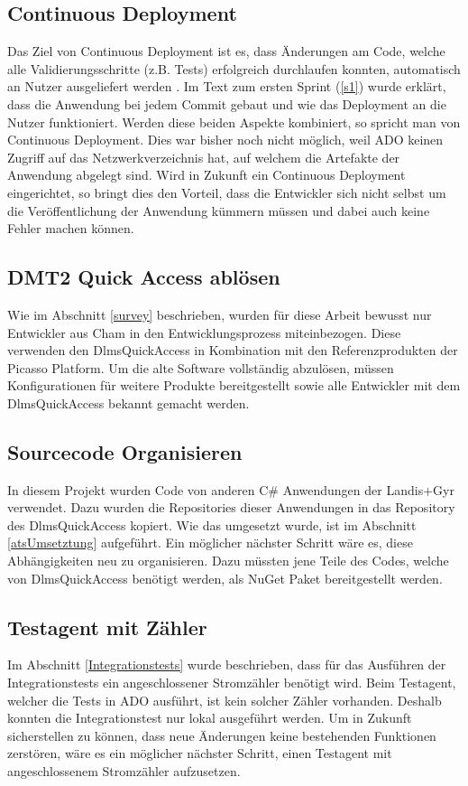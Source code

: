 \subsection{Continuous Deployment}
Das Ziel von Continuous Deployment ist es, dass Änderungen am Code, welche alle Validierungsschritte (z.B. Tests) erfolgreich durchlaufen konnten, automatisch an Nutzer ausgeliefert werden \parencite{atlassian_2019}.
Im Text zum ersten Sprint (\ref{s1}) wurde erklärt, dass die Anwendung bei jedem Commit gebaut und wie das Deployment an die Nutzer funktioniert.
Werden diese beiden Aspekte kombiniert, so spricht man von Continuous Deployment.
Dies war bisher noch nicht möglich, weil \ac{ADO} keinen Zugriff auf das Netzwerkverzeichnis hat, auf welchem die Artefakte der Anwendung abgelegt sind.
Wird in Zukunft ein Continuous Deployment eingerichtet, so bringt dies den Vorteil, dass die Entwickler sich nicht selbst um die Veröffentlichung der Anwendung kümmern müssen und dabei auch keine Fehler machen können.

\subsection{DMT2 Quick Access ablösen}\label{moreUser}
Wie im Abschnitt \ref{survey} beschrieben, wurden für diese Arbeit bewusst nur Entwickler aus Cham in den Entwicklungsprozess miteinbezogen.
Diese verwenden den DlmsQuickAccess in Kombination mit den Referenzprodukten der Picasso Platform.
Um die alte Software vollständig abzulösen, müssen Konfigurationen für weitere Produkte bereitgestellt sowie alle Entwickler mit dem DlmsQuickAccess bekannt gemacht werden.


\subsection{Sourcecode Organisieren}\label{ausblick:ats_split}
In diesem Projekt wurden Code von anderen C\# Anwendungen der Landis+Gyr verwendet.
Dazu wurden die Repositories dieser Anwendungen in das Repository des DlmsQuickAccess kopiert.
Wie das umgesetzt wurde, ist im Abschnitt \ref{atsUmsetztung} aufgeführt. 
Ein möglicher nächster Schritt wäre es, diese Abhängigkeiten neu zu organisieren.
Dazu müssten jene Teile des Codes, welche von DlmsQuickAccess benötigt werden, als NuGet Paket bereitgestellt werden.


\subsection{Testagent mit Zähler}
Im Abschnitt \ref{Integrationstests} wurde beschrieben, dass für das Ausführen der Integrationstests ein angeschlossener Stromzähler benötigt wird.
Beim Testagent, welcher die Tests in \ac{ADO} ausführt, ist kein solcher Zähler vorhanden.
Deshalb konnten die Integrationstest nur lokal ausgeführt werden.
Um in Zukunft sicherstellen zu können, dass neue Änderungen keine bestehenden Funktionen zerstören, wäre es ein möglicher nächster Schritt, einen Testagent mit angeschlossenem Stromzähler aufzusetzen.

